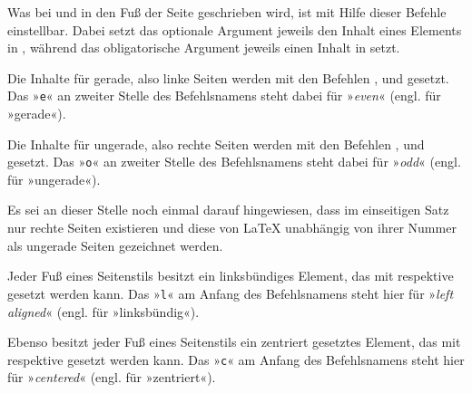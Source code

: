 \begin{Declaration}
\end{Declaration}
Was bei  und
 in den Fuß der Seite
geschrieben wird, ist mit Hilfe dieser Befehle einstellbar. Dabei setzt das
optionale Argument jeweils den Inhalt eines Elements in
, während das obligatorische
Argument jeweils einen Inhalt in 
setzt.

Die Inhalte für gerade, also linke Seiten werden mit den
Befehlen ,  und  gesetzt. Das
»\texttt{e}« an zweiter Stelle des Befehlsnamens steht dabei für »\emph{even}«
(engl. für »gerade«).

Die Inhalte für ungerade, also rechte Seiten werden mit
den Befehlen ,  und  gesetzt. Das
»\texttt{o}« an zweiter Stelle des Befehlsnamens steht dabei für »\emph{odd}«
(engl. für »ungerade«).

Es sei an dieser Stelle noch einmal darauf hingewiesen,
dass im einseitigen Satz nur rechte Seiten existieren und diese von \LaTeX{}
unabhängig von ihrer Nummer als ungerade Seiten gezeichnet werden.

Jeder Fuß eines Seitenstils besitzt ein linksbündiges
Element, das mit  respektive  gesetzt werden
kann. Das »\texttt{l}« am Anfang des Befehlsnamens steht hier für »\emph{left
  aligned}« (engl. für »linksbündig«).

Ebenso besitzt jeder Fuß eines Seitenstils ein zentriert
gesetztes Element, das mit  respektive  gesetzt
werden kann. Das »\texttt{c}« am Anfang des Befehlsnamens steht hier für
»\emph{centered}« (engl. für »zentriert«).

